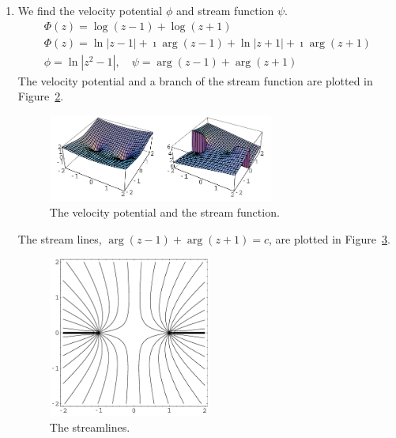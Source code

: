 {\begin{Solution}
\begin{enumerate}
\begin{figure}[htb!]
\begin{center}
      \end{center}
      \caption{Velocity field and velocity direction field.}
      \label{figure velocity-field-logzilogz}
    \end{figure}
  \item 
    We find the velocity potential $\phi$ and stream function $\psi$.
    \begin{gather*}
      \Phi(z) = \log(z - 1) + \log(z + 1)
      \\
      \Phi(z) = \ln |z-1| + \imath \arg(z-1) + \ln |z+1| + \imath \arg(z+1)
      \\
      \phi = \ln |z^2 - 1|, \quad \psi = \arg(z-1) + \arg(z+1)
    \end{gather*}
    The velocity potential and a branch of the stream function are plotted in 
    Figure~\ref{figure velocity-stream-logz1logz1}.
    \begin{figure}[htb!]
      \begin{center}
        \includegraphics[width=0.7\textwidth]{fcv/analytic/velocity-stream-logz1logz1}
      \end{center}
      \caption{The velocity potential and the stream function.}
      \label{figure velocity-stream-logz1logz1}
    \end{figure}
    
    The stream lines, $\arg(z-1) + \arg(z+1) = c$,
    are plotted in Figure~\ref{figure streamlines-logz1logz1}.
    \begin{figure}[htb!]
      \begin{center}
        \includegraphics[width=0.5\textwidth]{fcv/analytic/streamlines-logz1logz1}
      \end{center}
      \caption{The streamlines.}
      \label{figure streamlines-logz1logz1}
    \end{figure}


\end{enumerate}
\end{Solution}}
